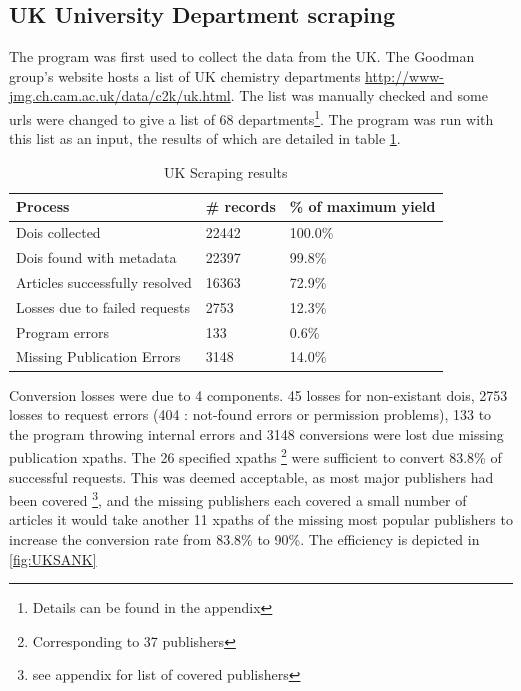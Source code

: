 \subsection{UK University Department scraping}
\label{sec:UKSCRAPE}
The program was first used to collect the data from the UK. The Goodman group's website hosts a list of UK chemistry departments \url{http://www-jmg.ch.cam.ac.uk/data/c2k/uk.html}. The list was manually checked and some urls were changed to give a list of 68 departments\footnote{Details can be found in the appendix}. The program was run with this list as an input, the results of which are detailed in table \ref{tab:UKSCRAPERES}.
\begin{table}[h!]
\label{tab:UKSCRAPERES}
\caption{UK Scraping results}
\begin{center}
\begin{tabular}{||l|l|l||}
\hline
Process & \# records & \% of maximum yield\\
\hline
Dois collected & 22442 & 100.0\%\\
Dois found with metadata & 22397 & 99.8\%\\
Articles successfully resolved & 16363 & 72.9\%\\
Losses due to failed requests & 2753 & 12.3\%\\
Program errors & 133 & 0.6\%\\
Missing Publication Errors & 3148 & 14.0\% \\
\hline
\end{tabular}
\end{center}
\end{table}
Conversion losses were due to 4 components. 45 losses for non-existant dois, 2753 losses to request errors (404 : not-found errors or permission problems), 133 to the program throwing internal errors and 3148 conversions were lost due missing publication xpaths. The 26 specified xpaths \footnote{Corresponding to 37 publishers} were sufficient to convert 83.8\% of successful requests. This was deemed acceptable, as most major publishers had been covered \footnote{see appendix for list of covered publishers}, and the missing publishers each covered a small number of articles it would take another 11 xpaths of the missing most popular publishers to increase the conversion rate from 83.8\% to 90\%.
The efficiency is depicted in \ref{fig:UKSANK}

